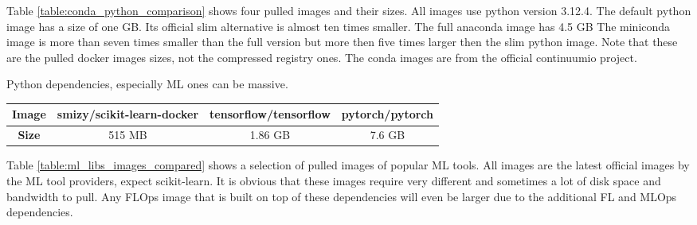 Table \ref{table:conda_python_comparison} shows four pulled images and their sizes.
All images use python version 3.12.4.
The default python image has a size of one GB.
Its official slim alternative is almost ten times smaller.
The full anaconda image has 4.5 GB
The miniconda image is more than seven times smaller than the full version but more then five times larger then the slim python image.
Note that these are the pulled docker images sizes, not the compressed registry ones.
The conda images are from the official continuumio project.

Python dependencies, especially ML ones can be massive.

\begin{changemargin}{0cm}{0cm}
    \centering
    \begin{tabular}{|c||c|c|c|}
        \hline
            \textbf{Image} & smizy/scikit-learn-docker & tensorflow/tensorflow & pytorch/pytorch \\
        \hline
            \textbf{Size} & 515 MB & 1.86 GB & 7.6 GB
        \\
        \hline
    \end{tabular}
    \label{table:ml_libs_images_compared}
\end{changemargin}

Table \ref{table:ml_libs_images_compared} shows a selection of pulled images of popular ML tools.
All images are the latest official images by the ML tool providers, expect scikit-learn.
It is obvious that these images require very different and sometimes a lot of disk space and bandwidth to pull.
Any FLOps image that is built on top of these dependencies will even be larger due to the additional FL and MLOps dependencies.
